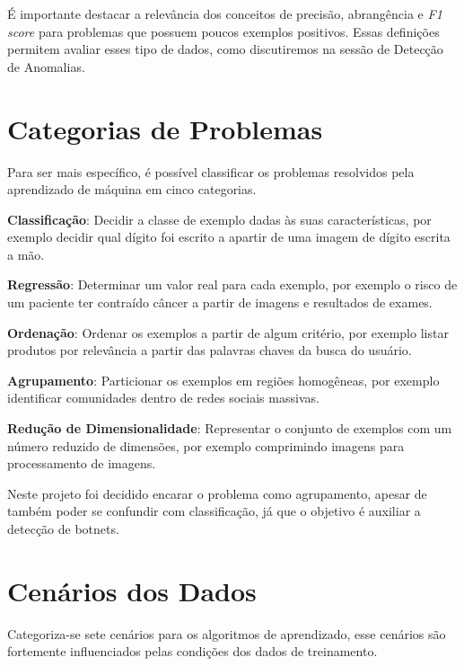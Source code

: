 É importante destacar a relevância dos conceitos de precisão, abrangência e \textit{F1 score} para problemas que possuem poucos exemplos positivos. Essas definições permitem avaliar esses tipo de dados, como discutiremos na sessão de Detecção de Anomalias.

\section{Categorias de Problemas}

Para ser mais específico, é possível classificar os problemas resolvidos pela aprendizado de máquina em cinco categorias\cite{mohri2012foundations}.

\begin{description}
\item \textbf{Classificação}: Decidir a classe de exemplo dadas às suas características, por exemplo decidir qual dígito foi escrito a apartir de uma imagem de dígito escrita a mão.
\item \textbf{Regressão}: Determinar um valor real para cada exemplo, por exemplo o risco de um paciente ter contraído câncer a partir de imagens e resultados de exames.
\item \textbf{Ordenação}: Ordenar os exemplos a partir de algum critério, por exemplo listar produtos por relevância a partir das palavras chaves da busca do usuário.
\item \textbf{Agrupamento}: Particionar os exemplos em regiões homogêneas, por exemplo identificar comunidades dentro de redes sociais massivas.
\item \textbf{Redução de Dimensionalidade}: Representar o conjunto de exemplos com um número reduzido de dimensões, por exemplo comprimindo imagens para processamento de imagens.
\end{description}


Neste projeto foi decidido encarar o problema como agrupamento, apesar de também poder se confundir com classificação, já que o objetivo é auxiliar a detecção de botnets. 

\section{Cenários dos Dados}

Categoriza-se\cite{mohri2012foundations} sete cenários para os algoritmos de aprendizado, esse cenários são fortemente influenciados pelas condições dos dados de treinamento.

